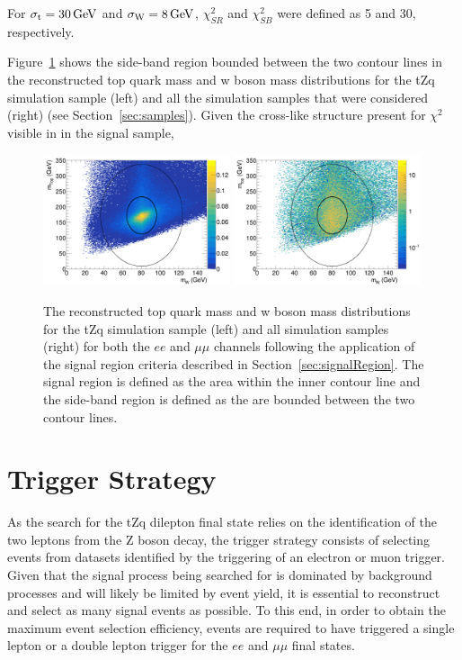 For $\sigma_{\mathrm{t}} = 30\,\text{Ge\hspace{-.08em}V}$ and $\sigma_{\mathrm{W}} = 8\,\text{Ge\hspace{-.08em}V}$, $\chi^{2}_{SR}$ and $\chi^{2}_{SB}$ were defined as 5 and 30, respectively.


Figure~\ref{fig:blindingChi2} shows the side-band region bounded between the two contour lines in the reconstructed top quark mass and w boson mass distributions for the tZq simulation sample (left) and all the simulation samples that were considered (right) (see Section~\ref{sec:samples}).
Given the cross-like structure present for $\chi^{2}$ visible in in the signal sample, 

\begin{figure}[!h]
\centering
\includegraphics[width=0.49\textwidth]{figs/blinding/tZq_topVsWmass.png}
\includegraphics[width=0.49\textwidth]{figs/blinding/all_topVsWmass.png}
\caption{
The reconstructed top quark mass and w boson mass distributions for the tZq simulation sample (left) and all simulation samples (right) for both the $ee$ and $\mu\mu$ channels following the application of the signal region criteria described in Section~\ref{sec:signalRegion}.
The signal region is defined as the area within the inner contour line and the side-band region is defined as the are bounded between the two contour lines.
}
\label{fig:blindingChi2}
\end{figure}

\section{Trigger Strategy}\label{sec:triggerStrategy}
As the search for the tZq dilepton final state relies on the identification of the two leptons from the Z boson decay, the trigger strategy consists of selecting events from datasets identified by the triggering of an electron or muon trigger.
Given that the signal process being searched for is dominated by background processes and will likely be limited by event yield, it is essential to reconstruct and select as many signal events as possible.
To this end, in order to obtain the maximum event selection efficiency, events are required to have triggered a single lepton or a double lepton trigger for the $ee$ and $\mu\mu$ final states.

